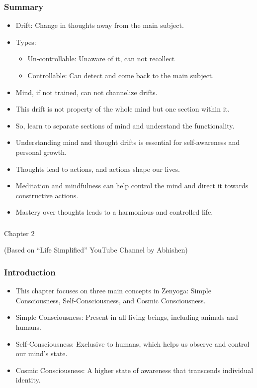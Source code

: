 \begin{frame}[fragile]\frametitle{Summary}

\begin{itemize}
	\item Drift: Change in thoughts away from the main subject.
	\item Types:
		\begin{itemize}
			\item Un-controllable: Unaware of it, can not recollect
			\item Controllable: Can detect and come back to the main subject.
		\end{itemize}
	\item Mind, if not trained, can not channelize drifts.
	\item This drift is not property of the whole mind but one section within it.
	\item So, learn to separate sections of mind and understand the functionality.
    \item Understanding mind and thought drifts is essential for self-awareness and personal growth.
    \item Thoughts lead to actions, and actions shape our lives.
    \item Meditation and mindfulness can help control the mind and direct it towards constructive actions.
    \item Mastery over thoughts leads to a harmonious and controlled life.
\end{itemize}

\end{frame}

\begin{frame}[fragile]\frametitle{}
\begin{center}
{\Large Chapter 2}

{\tiny (Based on ``Life Simplified'' YouTube Channel by Abhishen)}
\end{center}
\end{frame}


\begin{frame}[fragile]\frametitle{Introduction}
  \begin{itemize}
    \item This chapter focuses on three main concepts in Zenyoga: Simple Consciousness, Self-Consciousness, and Cosmic Consciousness.
    \item Simple Consciousness: Present in all living beings, including animals and humans.
    \item Self-Consciousness: Exclusive to humans, which helps us observe and control our mind's state.
    \item Cosmic Consciousness: A higher state of awareness that transcends individual identity.
  \end{itemize}
\end{frame}

